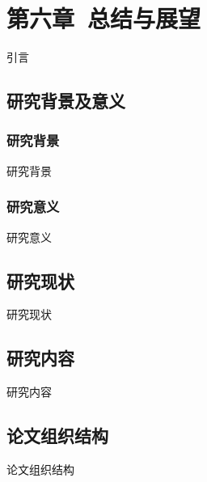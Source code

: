 \setcounter{section}{6}
\setcounter{subsection}{0}
\section*{第六章\ 总结与展望}
引言
\subsection{研究背景及意义}
\subsubsection{研究背景}
研究背景
\subsubsection{研究意义}
研究意义
\subsection{研究现状}
研究现状
\subsection{研究内容}
研究内容
\subsection{论文组织结构}
论文组织结构

\pagestyle{fancy}			%
\chead{}	%

